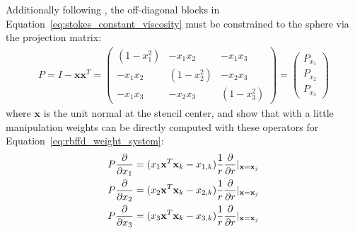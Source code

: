 Additionally following \cite{FlyerWright09, FlyerLehto11}, the off-diagonal blocks in Equation~\ref{eq:stokes_constant_viscosity} must be constrained to the sphere via the projection matrix: 
\begin{align}
P = I - \mathbf{x} \mathbf{x}^T =  \begin{pmatrix} 
(1-x_1^2) & -x_1 x_2 & -x_1 x_3 \\
-x_1 x_2 & (1-x_2^2) & -x_2 x_3 \\ 
-x_1 x_3 & -x_2 x_3 & (1-x_3^2) 
\end{pmatrix} = \begin{pmatrix} P_{x_1} \\ P_{x_2} \\ P_{x_3} \end{pmatrix}
\label{eq:project_gradient}
\end{align}
where $\mathbf{x}$ is the unit normal at the stencil center, and 
%
%
\cite{FlyerWright09, FlyerLehto11} show that with a little manipulation weights can be directly computed with these operators for Equation~\ref{eq:rbffd_weight_system}: 
\begin{align} 
P\frac{\partial }{\partial x_1} = ( x_1 \mathbf{x}^T \mathbf{x}_k - x_{1,k}) \frac{1}{r} \frac{\partial }{\partial r} |_{\mathbf{x}=\mathbf{x}_j} \\
P\frac{\partial }{\partial x_2} = ( x_2 \mathbf{x}^T \mathbf{x}_k - x_{2,k}) \frac{1}{r} \frac{\partial }{\partial r} |_{\mathbf{x}=\mathbf{x}_j} \\
P\frac{\partial }{\partial x_3} = ( x_3 \mathbf{x}^T \mathbf{x}_k - x_{3,k}) \frac{1}{r} \frac{\partial }{\partial r} |_{\mathbf{x}=\mathbf{x}_j}
\end{align}


